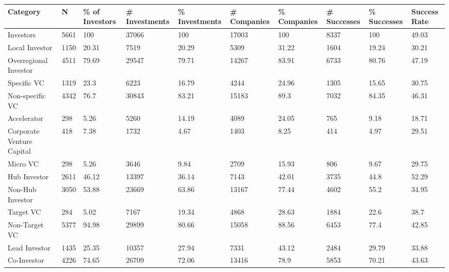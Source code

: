 \begin{tabular}{llllllllll}
  \toprule
Category & N & \% of Investors & # Investments & \% Investments & # Companies & \% Companies & # Successes & \% Successes & Success Rate \\ 
  \midrule
Investors & 5661 & 100 & 37066 & 100 & 17003 & 100 & 8337 & 100 & 49.03 \\ 
  Local Investor & 1150 & 20.31 & 7519 & 20.29 & 5309 & 31.22 & 1604 & 19.24 & 30.21 \\ 
  Overregional Investor & 4511 & 79.69 & 29547 & 79.71 & 14267 & 83.91 & 6733 & 80.76 & 47.19 \\ 
  Specific VC & 1319 & 23.3 & 6223 & 16.79 & 4244 & 24.96 & 1305 & 15.65 & 30.75 \\ 
  Non-specific VC & 4342 & 76.7 & 30843 & 83.21 & 15183 & 89.3 & 7032 & 84.35 & 46.31 \\ 
  Accelerator & 298 & 5.26 & 5260 & 14.19 & 4089 & 24.05 & 765 & 9.18 & 18.71 \\ 
  Corporate Venture Capital & 418 & 7.38 & 1732 & 4.67 & 1403 & 8.25 & 414 & 4.97 & 29.51 \\ 
  Micro VC & 298 & 5.26 & 3646 & 9.84 & 2709 & 15.93 & 806 & 9.67 & 29.75 \\ 
  Hub Investor & 2611 & 46.12 & 13397 & 36.14 & 7143 & 42.01 & 3735 & 44.8 & 52.29 \\ 
  Non-Hub Investor & 3050 & 53.88 & 23669 & 63.86 & 13167 & 77.44 & 4602 & 55.2 & 34.95 \\ 
  Target VC & 284 & 5.02 & 7167 & 19.34 & 4868 & 28.63 & 1884 & 22.6 & 38.7 \\ 
  Non-Target VC & 5377 & 94.98 & 29899 & 80.66 & 15058 & 88.56 & 6453 & 77.4 & 42.85 \\ 
  Lead Investor & 1435 & 25.35 & 10357 & 27.94 & 7331 & 43.12 & 2484 & 29.79 & 33.88 \\ 
  Co-Investor & 4226 & 74.65 & 26709 & 72.06 & 13416 & 78.9 & 5853 & 70.21 & 43.63 \\ 
   \bottomrule
\end{tabular}
